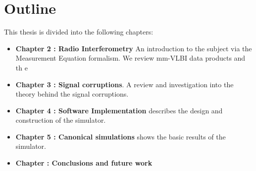 \section{Outline}

This thesis is divided into the following chapters:
\begin{itemize}
 \item {\bf Chapter 2 : Radio Interferometry} An introduction to the subject via the Measurement Equation formalism. We review mm-VLBI data products and th e
 \item {\bf Chapter 3 : Signal corruptions}. A review and investigation into the theory behind the signal corruptions.
 \item {\bf Chapter 4 : Software Implementation} describes the design and construction of the simulator.
 \item {\bf Chapter 5 : Canonical simulations} shows the basic results of the simulator.
 \item {\bf Chapter  : Conclusions and future work}
 
\end{itemize}
















